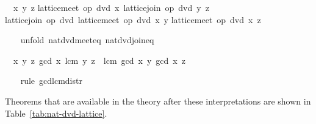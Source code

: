 \begin{isabellebody}
\begin{isamarkuptxt}
\begin{isabelle}%
\ {}{\isachardot}\ {\isasymAnd}x\ y\ z{\isachardot}\isanewline
{}lattice{\isachardot}meet\ op\ dvd\ x\ {\isacharparenleft}lattice{\isachardot}join\ op\ dvd\ y\ z{\isacharparenright}\ {\isacharequal}\isanewline
{}lattice{\isachardot}join\ op\ dvd\ {\isacharparenleft}lattice{\isachardot}meet\ op\ dvd\ x\ y{\isacharparenright}\isanewline
{}lattice{\isachardot}meet\ op\ dvd\ x\ z{\isacharparenright}%
\end{isabelle}%
\end{isamarkuptxt}%
\isamarkuptrue%
\ \ \isamarkupfalse%
\ {\isacharparenleft}unfold\ nat{\isacharunderscore}dvd{\isacharunderscore}meet{\isacharunderscore}eq\ nat{\isacharunderscore}dvd{\isacharunderscore}join{\isacharunderscore}eq{\isacharparenright}%
\begin{isamarkuptxt}%
\begin{isabelle}%
\ {}{\isachardot}\ {\isasymAnd}x\ y\ z{\isachardot}\ gcd\ x\ {\isacharparenleft}lcm\ y\ z{\isacharparenright}\ {\isacharequal}\ lcm\ {\isacharparenleft}gcd\ x\ y{\isacharparenright}\ {\isacharparenleft}gcd\ x\ z{\isacharparenright}%
\end{isabelle}%
\end{isamarkuptxt}%
\isamarkuptrue%
\ \ \isamarkupfalse%
\ {\isacharparenleft}rule\ gcd{\isacharunderscore}lcm{\isacharunderscore}distr{\isacharparenright}\ \isamarkupfalse%
%
\endisatagvisible
{\isafoldvisible}%
%
\isadelimvisible
%
\endisadelimvisible
%
\begin{isamarkuptext}%
Theorems that are available in the theory after these
  interpretations are shown in Table~\ref{tab:nat-dvd-lattice}.


\end{isamarkuptext}
\end{isabellebody}
